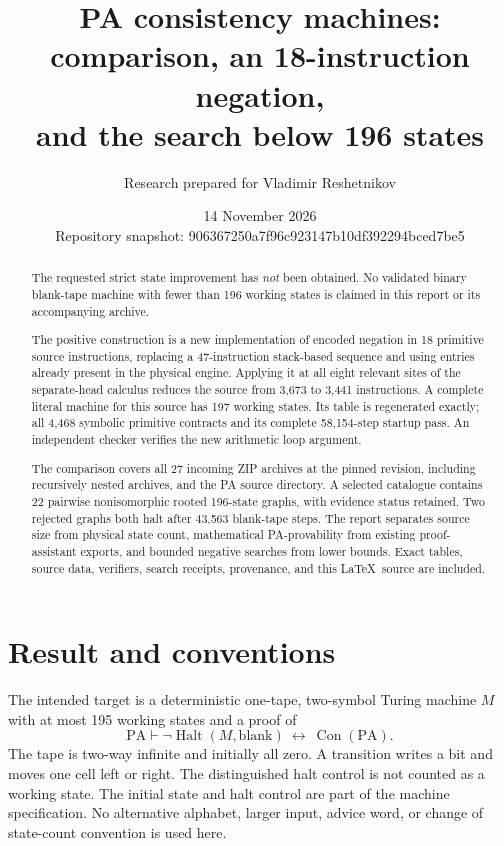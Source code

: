 \documentclass[11pt,a4paper]{article}
\title{PA consistency machines:\\comparison, an 18-instruction negation,\\and the search below 196 states}
\author{Research prepared for Vladimir Reshetnikov}
\date{14 November 2026\\\small Repository snapshot: 906367250a7f96c923147b10df392294bced7be5}
\newcommand{\PA}{\mathrm{PA}}
\newcommand{\Con}{\operatorname{Con}}
\newcommand{\Halt}{\operatorname{Halt}}
\begin{document}
\maketitle
\begin{abstract}
The requested strict state improvement has \emph{not} been obtained. No
validated binary blank-tape machine with fewer than 196 working states is
claimed in this report or its accompanying archive.

The positive construction is a new implementation of encoded negation in
18 primitive source instructions, replacing a 47-instruction stack-based
sequence and using entries already present in the physical engine. Applying
it at all eight relevant sites of the separate-head calculus reduces the
source from 3,673 to 3,441 instructions. A complete literal machine for this
source has 197 working states. Its table is regenerated exactly; all 4,468
symbolic primitive contracts and its complete 58,154-step startup pass.
An independent checker verifies the new arithmetic loop argument.

The comparison covers all 27 incoming ZIP archives at the pinned revision,
including recursively nested archives, and the PA source directory. A
selected catalogue contains 22 pairwise nonisomorphic rooted 196-state
graphs, with evidence status retained. Two rejected graphs both halt after
43,563 blank-tape steps. The report separates source size from physical
state count, mathematical PA-provability from existing proof-assistant
exports, and bounded negative searches from lower bounds. Exact tables,
source data, verifiers, search receipts, provenance, and this \LaTeX\ source
are included.
\end{abstract}
\clearpage
\tableofcontents
\clearpage

\section{Result and conventions}

The intended target is a deterministic one-tape, two-symbol Turing machine
$M$ with at most 195 working states and a proof of
\begin{equation}\label{eq:target}
 \PA\vdash
 \neg\Halt(M,\mathrm{blank})\ \longleftrightarrow\ \Con(\PA).
\end{equation}
The tape is two-way infinite and initially all zero. A transition writes a
bit and moves one cell left or right. The distinguished halt control is
not counted as a working state. The initial state and halt control are part
of the machine specification. No alternative alphabet, larger input, advice
word, or change of state-count convention is used here.
\end{document}
